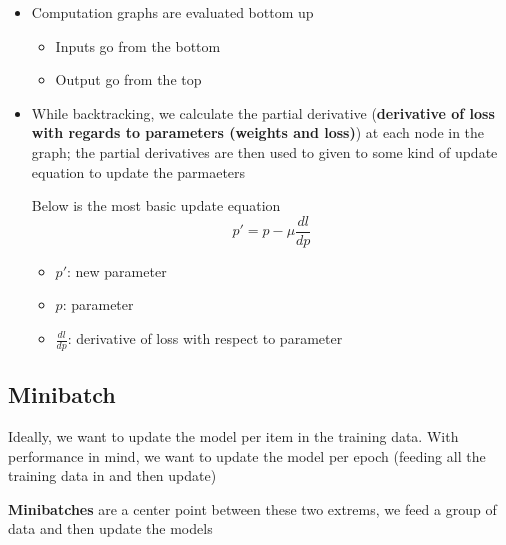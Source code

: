     \begin{itemize}
      \item Computation graphs are evaluated bottom up
      \begin{itemize}
        \item Inputs go from the bottom
        \item Output go from the top
      \end{itemize}

      \item While backtracking, we calculate the partial derivative
      (\textbf{derivative of loss with regards to parameters (weights and loss)})
      at each node in the graph; the partial derivatives are then used to given
      to some kind of update equation to update the parmaeters

      Below is the most basic update equation
      \begin{equation}
        p' = p - \mu \frac{dl}{dp}
      \end{equation}

      \begin{itemize}
        \item $ p' $: new parameter
        \item $ p $: parameter
        \item $ \frac{dl}{dp} $: derivative of loss with respect to parameter
      \end{itemize}
    \end{itemize}

  \subsection{Minibatch}

    Ideally, we want to update the model per item in the training data.
    With performance in mind, we want to update the model per epoch
    (feeding all the training data in and then update)

    \textbf{Minibatches} are a center point between these two extrems,
    we feed a group of data and then update the models
